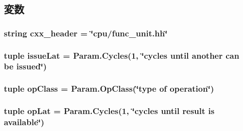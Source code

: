 \subsection{変数}
\hypertarget{classFuncUnit_1_1OpDesc_a17da7064bc5c518791f0c891eff05fda}{
\subsubsection[{cxx\_\-header}]{\setlength{\rightskip}{0pt plus 5cm}string {\bf cxx\_\-header} = \char`\"{}cpu/func\_\-unit.hh\char`\"{}}}
\label{classFuncUnit_1_1OpDesc_a17da7064bc5c518791f0c891eff05fda}
\hypertarget{classFuncUnit_1_1OpDesc_a1260d42d5e46d079562856033114905c}{
\subsubsection[{issueLat}]{\setlength{\rightskip}{0pt plus 5cm}tuple {\bf issueLat} = Param.Cycles(1, \char`\"{}cycles until another can be issued\char`\"{})}}
\label{classFuncUnit_1_1OpDesc_a1260d42d5e46d079562856033114905c}
\hypertarget{classFuncUnit_1_1OpDesc_a5ecb2be2abbb3f1b98624255ef24e372}{
\subsubsection[{opClass}]{\setlength{\rightskip}{0pt plus 5cm}tuple {\bf opClass} = Param.OpClass(\char`\"{}type of operation\char`\"{})}}
\label{classFuncUnit_1_1OpDesc_a5ecb2be2abbb3f1b98624255ef24e372}
\hypertarget{classFuncUnit_1_1OpDesc_a74d6c7d348235c1e30e0fd7c1322a773}{
\subsubsection[{opLat}]{\setlength{\rightskip}{0pt plus 5cm}tuple {\bf opLat} = Param.Cycles(1, \char`\"{}cycles until result is available\char`\"{})}}
